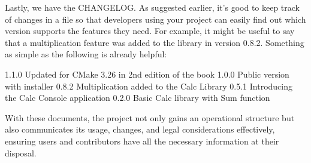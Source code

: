 Lastly, we have the CHANGELOG. As suggested earlier, it’s good to keep track of changes in a file so that developers using your project can easily find out which version supports the features they need. For example, it might be useful to say that a multiplication feature was added to the library in version 0.8.2. Something as simple as the following is already helpful:


\begin{shell}
1.1.0 Updated for CMake 3.26 in 2nd edition of the book
1.0.0 Public version with installer
0.8.2 Multiplication added to the Calc Library
0.5.1 Introducing the Calc Console application
0.2.0 Basic Calc library with Sum function
\end{shell}

With these documents, the project not only gains an operational structure but also communicates its usage, changes, and legal considerations effectively, ensuring users and contributors have all the necessary information at their disposal.







































